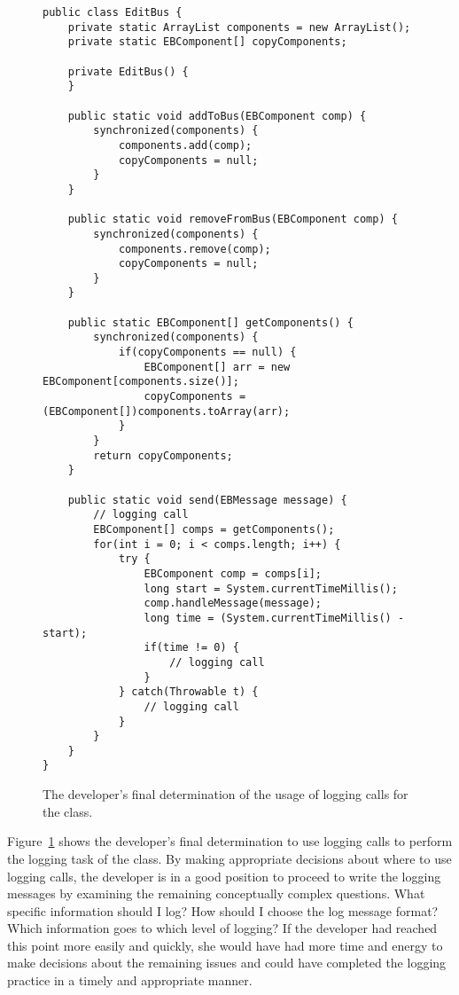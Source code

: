 \begin{figure}[p]
\def\baselinestretch{0.94}
\begin{lstlisting}
public class EditBus {
    private static ArrayList components = new ArrayList();
    private static EBComponent[] copyComponents;

    private EditBus() {
    }

    public static void addToBus(EBComponent comp) {
        synchronized(components) {
            components.add(comp);
            copyComponents = null;
        }
    }

    public static void removeFromBus(EBComponent comp) {
        synchronized(components) {
            components.remove(comp);
            copyComponents = null;
        }
    }

    public static EBComponent[] getComponents() {
        synchronized(components) {
            if(copyComponents == null) {
                EBComponent[] arr = new EBComponent[components.size()];
                copyComponents = (EBComponent[])components.toArray(arr);
            }
        }
        return copyComponents;
    }

    public static void send(EBMessage message) {
        // logging call
        EBComponent[] comps = getComponents();
        for(int i = 0; i < comps.length; i++) {
            try {
                EBComponent comp = comps[i];
                long start = System.currentTimeMillis();
                comp.handleMessage(message);
                long time = (System.currentTimeMillis() - start);
                if(time != 0) {
                    // logging call
                }
            } catch(Throwable t) {
                // logging call
            }
        }
    }
}
\end{lstlisting}
\caption[The developer's final determination of the usage of logging calls.]{The developer's final determination of the usage of logging calls for the  class.\label{ch2-ex-logged}}
\end{figure}

Figure~\ref{ch2-ex-logged} shows the developer's final determination to use logging calls to perform the logging task of the  class. By making appropriate decisions about where to use logging calls, the developer is in a good position to proceed to write the logging messages by examining the remaining conceptually complex questions. What specific information should I log? How should I choose the log message format? Which information goes to which level of logging? If the developer had reached this point more easily and quickly, she would have had more time and energy to make decisions about the remaining issues and could have completed the logging practice in a timely and appropriate manner.

